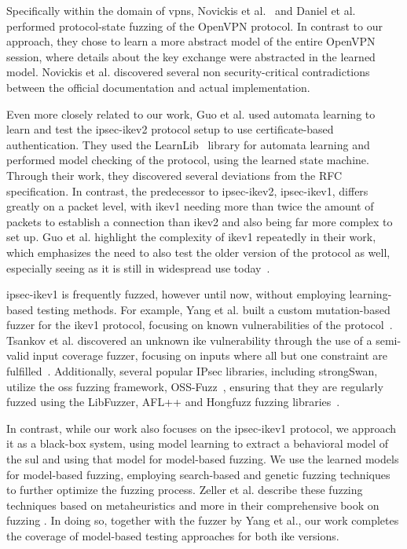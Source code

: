 Specifically within the domain of \acp{vpn}, Novickis et al.~\cite{novickis2016protocol} and Daniel et al.~\cite{daniel2018inferring} performed protocol-state fuzzing of the OpenVPN protocol. In contrast to our approach, they chose to learn a more abstract model of the entire OpenVPN session, where details about the key exchange were abstracted in the learned model. Novickis et al. discovered several non security-critical contradictions between the official documentation and actual implementation.

Even more closely related to our work, Guo et al. \cite{guo2019model} used automata learning to learn and test the \ac{ipsec}-\ac{ike}v2 protocol setup to use certificate-based authentication. They used the LearnLib~\cite{software:learnlib} library for automata learning and performed model checking of the protocol, using the learned state machine. Through their work, they discovered several deviations from the RFC specification.
In contrast, the predecessor to \ac{ipsec}-\ac{ike}v2, \ac{ipsec}-\ac{ike}v1, differs greatly on a packet level, with \ac{ike}v1 needing more than twice the amount of packets to establish a connection than \ac{ike}v2 and also being far more complex to set up. Guo et al. highlight the complexity of \ac{ike}v1 repeatedly in their work, which emphasizes the need to also test the older version of the protocol as well, especially seeing as it is still in widespread use today~\cite{avm2022}.

\ac{ipsec}-\ac{ike}v1 is frequently fuzzed, however until now, without employing learning-based testing methods. For example, Yang et al. built a custom mutation-based fuzzer for the \ac{ike}v1 protocol, focusing on known vulnerabilities of the protocol~\cite{ikefuzz13}. Tsankov et al. discovered an unknown \ac{ike} vulnerability through the use of a semi-valid input coverage fuzzer, focusing on inputs where all but one constraint are fulfilled~\cite{tsankov}. Additionally, several popular IPsec libraries, including strongSwan, utilize the \ac{oss} fuzzing framework, OSS-Fuzz~\cite{serebryany2017oss}, ensuring that they are regularly fuzzed using the LibFuzzer, AFL++ and Hongfuzz fuzzing libraries~\cite{serebryany-libfuzzer, AFLplusplus-Woot20, swiecki-honggfuzz}.

In contrast, while our work also focuses on the \ac{ipsec}-\ac{ike}v1 protocol, we approach it as a black-box system, using model learning to extract a behavioral model of the \ac{sul} and using that model for model-based fuzzing. We use the learned models for model-based fuzzing, employing search-based and genetic fuzzing techniques to further optimize the fuzzing process. Zeller et al. describe these fuzzing techniques based on metaheuristics and more in their comprehensive book on fuzzing \cite{fuzzingbook2023:SearchBasedFuzzer}. In doing so, together with the fuzzer by Yang et al., our work completes the coverage of model-based testing approaches for both \ac{ike} versions.

